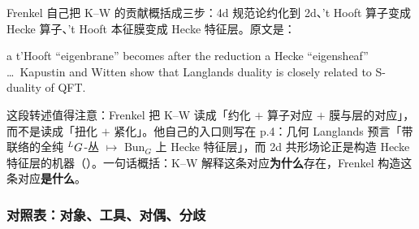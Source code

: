 Frenkel 自己把 K--W 的贡献概括成三步：4d 规范论约化到 2d、't Hooft 算子变成 Hecke 算子、't Hooft 本征膜变成 Hecke 特征层。\pA 原文是：\pA
\begin{origquote}
a t'Hooft ``eigenbrane'' becomes after the reduction a Hecke ``eigensheaf'' \ldots\ Kapustin and Witten show that Langlands duality is closely related to S-duality of QFT. 
\end{origquote}
这段转述值得注意：Frenkel 把 K--W 读成「约化 $+$ 算子对应 $+$ 膜与层的对应」，而不是读成「扭化 $+$ 紧化」。\pB 他自己的入口则写在 p.4：几何 Langlands 预言「带联络的全纯 ${}^{L}G$-丛 $\mapsto$ $\mathrm{Bun}_G$ 上 Hecke 特征层」，而 2d 共形场论正是构造 Hecke 特征层的机器（）。\pA 一句话概括：K--W 解释这条对应\textbf{为什么}存在，Frenkel 构造这条对应\textbf{是什么}。\pC

\subsubsection*{对照表：对象、工具、对偶、分歧}

